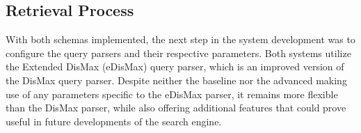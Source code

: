 \documentclass[sigconf]{acmart}
\begin{document}
\begin{table}[H]
    \caption{Advanced Schema}
    \label{tab:schema}
\end{table}

\subsection{Retrieval Process}

With both schemas implemented, the next step in the system development was to configure the query parsers and their respective parameters. Both systems utilize the Extended DisMax (eDisMax) query parser\cite{edismax}, which is an improved version of the DisMax query parser\cite{dismax}. Despite neither the baseline nor the advanced making use of any parameters specific to the eDisMax parser, it remains more flexible than the DisMax parser, while also offering additional features that could prove useful in future developments of the search engine.
\end{document}
